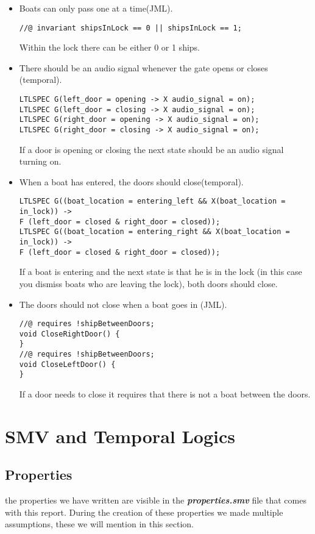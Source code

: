 \documentclass[a4paper]{article}
\begin{document}
\begin{itemize}
		\item Boats can only pass one at a time(JML).
		\begin{lstlisting}
//@ invariant shipsInLock == 0 || shipsInLock == 1;
		\end{lstlisting}
		Within the lock there can be either 0 or 1 ships.
		
		\item There should be an audio signal whenever the gate opens or closes (temporal).
		\begin{lstlisting}
LTLSPEC G(left_door = opening -> X audio_signal = on);
LTLSPEC G(left_door = closing -> X audio_signal = on);
LTLSPEC G(right_door = opening -> X audio_signal = on);
LTLSPEC G(right_door = closing -> X audio_signal = on);
		\end{lstlisting}
		If a door is opening or closing the next state should be an audio signal turning on.
		
		\item When a boat has entered, the doors should close(temporal).
		\begin{lstlisting}
LTLSPEC G((boat_location = entering_left && X(boat_location = in_lock)) ->
F (left_door = closed & right_door = closed));
LTLSPEC G((boat_location = entering_right && X(boat_location = in_lock)) ->
F (left_door = closed & right_door = closed));
		\end{lstlisting}
		If a boat is entering and the next state is that he is in the lock (in this case you dismiss boats who are leaving the lock), both doors should close.
		
		\item The doors should not close when a boat goes in (JML).
		\begin{lstlisting}
//@ requires !shipBetweenDoors;
void CloseRightDoor() {
}
//@ requires !shipBetweenDoors;
void CloseLeftDoor() {
}
		\end{lstlisting}
		If a door needs to close it requires that there is not a boat between the doors.
	\end{itemize}
	
	\section{SMV and Temporal Logics}
	
	
	\subsection{Properties}
	the properties we have written are visible in the \textit{\textbf{properties.smv}} file that comes with this report.
	During the creation of these properties we made multiple assumptions, these we will mention in this section.
	
\end{document}
